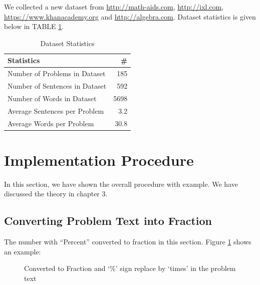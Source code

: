 \documentclass[document.tex]{subfiles}
\begin{document}
We collected a new dataset from \url{http://math-aids.com}, \url{http://ixl.com}, \url{https://www.khanacademy.org} and \url{http://algebra.com}. Dataset statistics is given below in TABLE \ref{tab:datasetstat}.

\begin{table}[H]
	\caption{Dataset Statistics}
	\begin{center}
		\begin{tabular}{|l | r|}
			\hline
			\textbf{Statistics}& \# \\ \hline
			Number of Problems in Dataset& 185 \\
			Number of Sentences in Dataset& 592\\
			Number of Words in Dataset& 5698\\
			Average Sentences per Problem& 3.2\\
			Average Words per Problem& 30.8\\
			\hline
		\end{tabular}
	\end{center}
	\label{tab:datasetstat}
\end{table}

\section{Implementation Procedure} In this section, we have shown the overall procedure with example. We have discussed the theory in chapter 3.

\subsection{Converting Problem Text into Fraction}
The number with ``Percent'' converted to fraction in this section. Figure \ref{fig:i_conv} shows an example:
\begin{figure}[H]
	
	\caption{Converted to Fraction and ‘\%’ sign replace by ‘times’ in the problem text}
	\label{fig:i_conv}
\end{figure}
\end{document}
